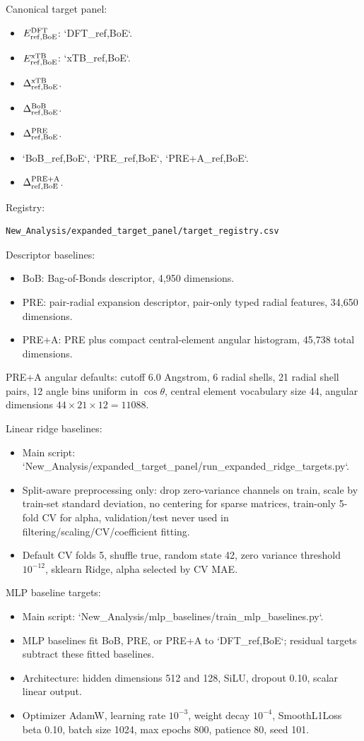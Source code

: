 Canonical target panel:
\begin{itemize}
  \item \(E_{\rm ref,BoE}^{\rm DFT}\): `DFT_ref,BoE`.
  \item \(E_{\rm ref,BoE}^{\rm xTB}\): `xTB_ref,BoE`.
  \item \(\Delta^{\rm xTB}_{\rm ref,BoE}\).
  \item \(\Delta^{\rm BoB}_{\rm ref,BoE}\).
  \item \(\Delta^{\rm PRE}_{\rm ref,BoE}\).
  \item `BoB_ref,BoE`, `PRE_ref,BoE`, `PRE+A_ref,BoE`.
  \item \(\Delta^{\rm PRE+A}_{\rm ref,BoE}\).
\end{itemize}
Registry:
\begin{verbatim}
New_Analysis/expanded_target_panel/target_registry.csv
\end{verbatim}

Descriptor baselines:
\begin{itemize}
  \item BoB: Bag-of-Bonds descriptor, 4,950 dimensions.
  \item PRE: pair-radial expansion descriptor, pair-only typed radial features, 34,650 dimensions.
  \item PRE+A: PRE plus compact central-element angular histogram, 45,738 total dimensions.
\end{itemize}
PRE+A angular defaults: cutoff 6.0 Angstrom, 6 radial shells, 21 radial shell pairs, 12 angle bins uniform in \(\cos\theta\), central element vocabulary size 44, angular dimensions \(44 \times 21 \times 12 = 11088\).

Linear ridge baselines:
\begin{itemize}
  \item Main script: `New_Analysis/expanded_target_panel/run_expanded_ridge_targets.py`.
  \item Split-aware preprocessing only: drop zero-variance channels on train, scale by train-set standard deviation, no centering for sparse matrices, train-only 5-fold CV for alpha, validation/test never used in filtering/scaling/CV/coefficient fitting.
  \item Default CV folds 5, shuffle true, random state 42, zero variance threshold \(10^{-12}\), sklearn Ridge, alpha selected by CV MAE.
\end{itemize}

MLP baseline targets:
\begin{itemize}
  \item Main script: `New_Analysis/mlp_baselines/train_mlp_baselines.py`.
  \item MLP baselines fit BoB, PRE, or PRE+A to `DFT_ref,BoE`; residual targets subtract these fitted baselines.
  \item Architecture: hidden dimensions 512 and 128, SiLU, dropout 0.10, scalar linear output.
  \item Optimizer AdamW, learning rate \(10^{-3}\), weight decay \(10^{-4}\), SmoothL1Loss beta 0.10, batch size 1024, max epochs 800, patience 80, seed 101.
\end{itemize}

